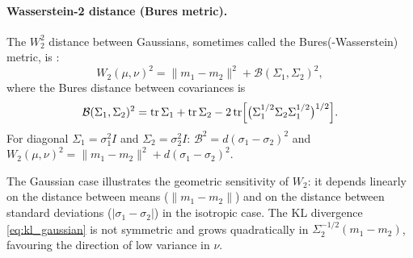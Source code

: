 \documentclass[12pt]{article}
\begin{document}
\paragraph{Wasserstein-2 distance (Bures metric).}
The $W_2^2$ distance between Gaussians, sometimes called the
Bures(-Wasserstein) metric, is \citep{Villani2009}:
\begin{equation}\label{eq:w2_gaussian}
  W_2(\mu,\nu)^2
  = \|m_1 - m_2\|^2
  + \mathcal{B}(\Sigma_1, \Sigma_2)^2,
\end{equation}
where the Bures distance between covariances is
\begin{equation}\label{eq:bures}
  \mathcal{B}(\Sigma_1, \Sigma_2)^2
  = \mathrm{tr}\,\Sigma_1 + \mathrm{tr}\,\Sigma_2
  - 2\,\mathrm{tr}\Bigl[
    \bigl(\Sigma_1^{1/2}\Sigma_2\Sigma_1^{1/2}\bigr)^{1/2}
  \Bigr].
\end{equation}
For diagonal $\Sigma_1 = \sigma_1^2 I$ and
$\Sigma_2 = \sigma_2^2 I$: $\mathcal{B}^2 = d(\sigma_1 - \sigma_2)^2$
and $W_2(\mu,\nu)^2 = \|m_1-m_2\|^2 + d(\sigma_1-\sigma_2)^2$.

The Gaussian case illustrates the geometric sensitivity of
$W_2$: it depends linearly on the distance between means
($\|m_1-m_2\|$) and on the distance between standard
deviations ($|\sigma_1-\sigma_2|$) in the isotropic case.
The KL divergence \eqref{eq:kl_gaussian} is not symmetric
and grows quadratically in $\Sigma_2^{-1/2}(m_1-m_2)$,
favouring the direction of low variance in $\nu$.

\bigskip


\end{document}
